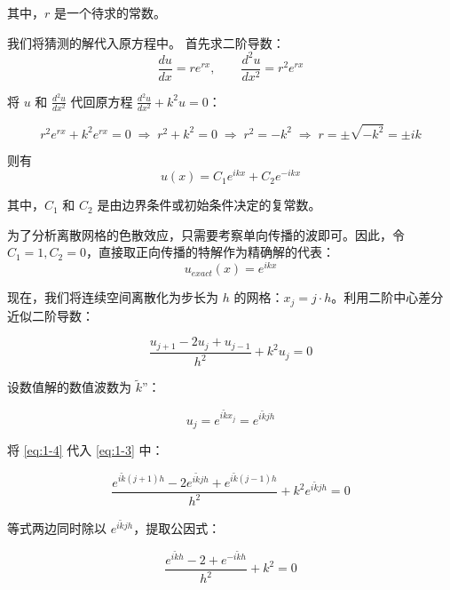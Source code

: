 \documentclass[12pt]{article}
\begin{document}
其中，$r$ 是一个待求的常数。

我们将猜测的解代入原方程中。
首先求二阶导数：
\begin{equation}
\frac{du}{dx} = r e^{rx}, \qquad \frac{d^2 u}{dx^2} = r^2 e^{rx}
\label{eq:derivatives}
\end{equation}

将 $u$ 和 $\frac{d^2 u}{dx^2}$ 代回原方程 $\frac{d^2 u}{dx^2} + k^2 u = 0$：

\begin{equation}
r^2 e^{rx} + k^2 e^{rx} = 0
\;\Longrightarrow\;
r^2 + k^2 = 0
\;\Longrightarrow\;
r^2 = -k^2
\;\Longrightarrow\;
r = \pm \sqrt{-k^2} = \pm i k
\label{eq:characteristic-chain}
\end{equation}

则有
\begin{equation}
u(x) = C_1 e^{i k x} + C_2 e^{-i k x}
\label{eq:general-solution}
\end{equation}

其中，$C_1$ 和 $C_2$ 是由边界条件或初始条件决定的复常数。

为了分析离散网格的色散效应，只需要考察单向传播的波即可。因此，令 $C_1 = 1, C_2 = 0$，直接取正向传播的特解作为精确解的代表：
\begin{equation}
u_{exact}(x) = e^{i k x}
\label{eq:exact-plane-wave}
\end{equation}


现在，我们将连续空间离散化为步长为 $h$ 的网格：$x_j = j \cdot h$。利用二阶中心差分近似二阶导数：

\begin{equation}
\frac{u_{j+1} - 2u_j + u_{j-1}}{h^2} + k^2 u_j = 0
\label{eq:1-3}
\end{equation}

设数值解的数值波数为 $\tilde{k}$”：

\begin{equation}
u_j = e^{i \tilde{k} x_j} = e^{i \tilde{k} j h}
\label{eq:1-4}
\end{equation}

将 \eqref{eq:1-4} 代入 \eqref{eq:1-3} 中：

\begin{equation}
\frac{e^{i \tilde{k} (j+1)h} - 2e^{i \tilde{k} jh} + e^{i \tilde{k} (j-1)h}}{h^2} + k^2 e^{i \tilde{k} jh} = 0
\label{eq:1-4-sub}
\end{equation}

等式两边同时除以 $e^{i \tilde{k} jh}$，提取公因式：

\begin{equation}
\frac{e^{i \tilde{k} h} - 2 + e^{-i \tilde{k} h}}{h^2} + k^2 = 0
\label{eq:1-5}
\end{equation}
\end{document}
